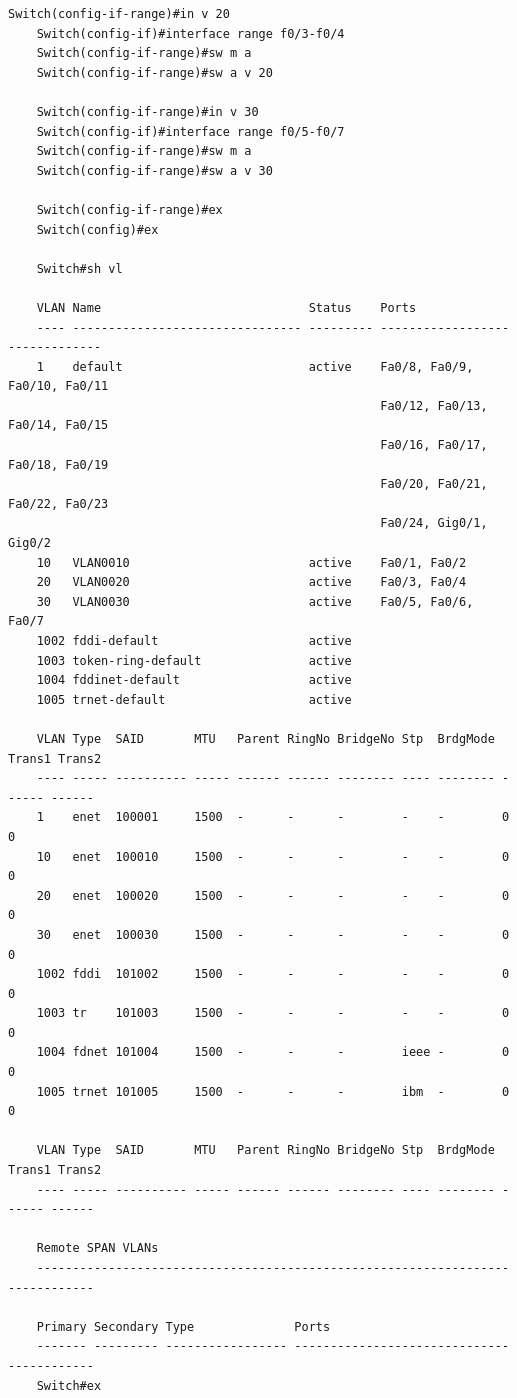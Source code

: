 \documentclass[a4paper,oneside,12pt]{extreport}
\begin{document}
\begin{lstlisting}[gobble=8, caption=Настройка коммутатора Switch0]
	Switch(config-if-range)#in v 20
	Switch(config-if)#interface range f0/3-f0/4
	Switch(config-if-range)#sw m a
	Switch(config-if-range)#sw a v 20

	Switch(config-if-range)#in v 30
	Switch(config-if)#interface range f0/5-f0/7
	Switch(config-if-range)#sw m a
	Switch(config-if-range)#sw a v 30

	Switch(config-if-range)#ex
	Switch(config)#ex

	Switch#sh vl

	VLAN Name                             Status    Ports
	---- -------------------------------- --------- -------------------------------
	1    default                          active    Fa0/8, Fa0/9, Fa0/10, Fa0/11
	                                                Fa0/12, Fa0/13, Fa0/14, Fa0/15
	                                                Fa0/16, Fa0/17, Fa0/18, Fa0/19
	                                                Fa0/20, Fa0/21, Fa0/22, Fa0/23
	                                                Fa0/24, Gig0/1, Gig0/2
	10   VLAN0010                         active    Fa0/1, Fa0/2
	20   VLAN0020                         active    Fa0/3, Fa0/4
	30   VLAN0030                         active    Fa0/5, Fa0/6, Fa0/7
	1002 fddi-default                     active
	1003 token-ring-default               active
	1004 fddinet-default                  active
	1005 trnet-default                    active

	VLAN Type  SAID       MTU   Parent RingNo BridgeNo Stp  BrdgMode Trans1 Trans2
	---- ----- ---------- ----- ------ ------ -------- ---- -------- ------ ------
	1    enet  100001     1500  -      -      -        -    -        0      0
	10   enet  100010     1500  -      -      -        -    -        0      0
	20   enet  100020     1500  -      -      -        -    -        0      0
	30   enet  100030     1500  -      -      -        -    -        0      0
	1002 fddi  101002     1500  -      -      -        -    -        0      0
	1003 tr    101003     1500  -      -      -        -    -        0      0
	1004 fdnet 101004     1500  -      -      -        ieee -        0      0
	1005 trnet 101005     1500  -      -      -        ibm  -        0      0

	VLAN Type  SAID       MTU   Parent RingNo BridgeNo Stp  BrdgMode Trans1 Trans2
	---- ----- ---------- ----- ------ ------ -------- ---- -------- ------ ------

	Remote SPAN VLANs
	------------------------------------------------------------------------------

	Primary Secondary Type              Ports
	------- --------- ----------------- ------------------------------------------
	Switch#ex
\end{lstlisting}
\end{document}

